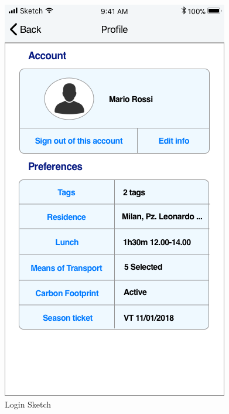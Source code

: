 \begin{figure}[H]
	\hspace{0.5cm}
	\includegraphics[scale=0.23]{Images/Interface/Login/4_profile_no_trips}
	\caption{Login Sketch}
\end{figure}

